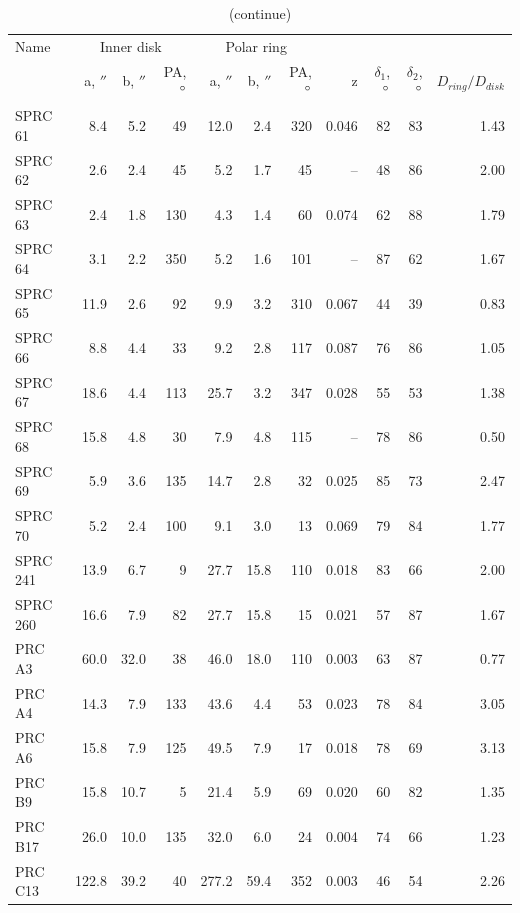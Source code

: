 \documentclass{ab}
\def\degr{\hbox{$^\circ$}}
\begin{document}
\begin{table}
\caption{(continue)}
\begin{tabular}{l|r|r|r|r|r|r|r|r|r|r}\hline\hline
Name    & \multicolumn{3}{c|}{Inner disk}	& \multicolumn{3}{c|}{ Polar ring} &     & &    &   \\	
   	    &a, $''$&b, $''$ &PA, $\degr$&a, $''$&b, $''$ &PA, $\degr$& z & $\delta_1$, $\degr$& $\delta_2$, $\degr$ & $D_{ring}/D_{disk}$\\	
\hline
 SPRC\,61&   8.4 &    5.2 &    49 &   12.0 &    2.4 &   320 &  0.046 &     82 &     83 &   1.43 \\
 SPRC\,62&   2.6 &    2.4 &    45 &    5.2 &    1.7 &    45 &     -- &     48 &     86 &   2.00 \\
 SPRC\,63&   2.4 &    1.8 &   130 &    4.3 &    1.4 &    60 &  0.074 &     62 &     88 &   1.79 \\
 SPRC\,64&   3.1 &    2.2 &   350 &    5.2 &    1.6 &   101 &     -- &     87 &     62 &   1.67 \\
 SPRC\,65&  11.9 &    2.6 &    92 &    9.9 &    3.2 &   310 &  0.067 &     44 &     39 &   0.83 \\
 SPRC\,66&   8.8 &    4.4 &    33 &    9.2 &    2.8 &   117 &  0.087 &     76 &     86 &   1.05 \\
 SPRC\,67&  18.6 &    4.4 &   113 &   25.7 &    3.2 &   347 &  0.028 &     55 &     53 &   1.38 \\
 SPRC\,68&  15.8 &    4.8 &    30 &    7.9 &    4.8 &   115 &     -- &     78 &     86 &   0.50 \\
 SPRC\,69&   5.9 &    3.6 &   135 &   14.7 &    2.8 &    32 &  0.025 &     85 &     73 &   2.47 \\
 SPRC\,70&   5.2 &    2.4 &   100 &    9.1 &    3.0 &    13 &  0.069 &     79 &     84 &   1.77 \\
SPRC\,241&  13.9 &    6.7 &     9 &   27.7 &   15.8 &   110 &  0.018 &     83 &     66 &   2.00 \\
SPRC\,260&  16.6 &    7.9 &    82 &   27.7 &   15.8 &    15 &  0.021 &     57 &     87 &   1.67 \\
  PRC\,A3&  60.0 &   32.0 &    38 &   46.0 &   18.0 &   110 &  0.003 &     63 &     87 &   0.77 \\
  PRC\,A4&  14.3 &    7.9 &   133 &   43.6 &    4.4 &    53 &  0.023 &     78 &     84 &   3.05 \\
  PRC\,A6&  15.8 &    7.9 &   125 &   49.5 &    7.9 &    17 &  0.018 &     78 &     69 &   3.13 \\
  PRC\,B9&  15.8 &   10.7 &     5 &   21.4 &    5.9 &    69 &  0.020 &     60 &     82 &   1.35 \\
 PRC\,B17&  26.0 &   10.0 &   135 &   32.0 &    6.0 &    24 &  0.004 &     74 &     66 &   1.23 \\
 PRC\,C13& 122.8 &   39.2 &    40 &  277.2 &   59.4 &   352 &  0.003 &     46 &     54 &   2.26 \\
\hline
\end{tabular}
\end{table}
\end{document}
